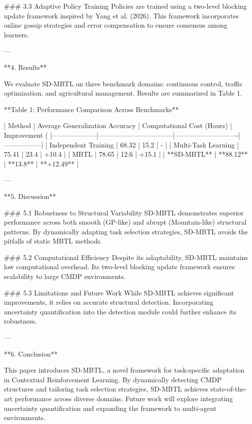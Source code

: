 ### 3.3 Adaptive Policy Training
Policies are trained using a two-level blocking update framework inspired by Yang et al. (2026). This framework incorporates online gossip strategies and error compensation to ensure consensus among learners.

---

**4. Results**

We evaluate SD-MBTL on three benchmark domains: continuous control, traffic optimization, and agricultural management. Results are summarized in Table 1.

**Table 1: Performance Comparison Across Benchmarks**

| Method            | Average Generalization Accuracy | Computational Cost (Hours) | Improvement (%
|--------------------|---------------------------------|----------------------------|-----------------|
| Independent Training | 68.32                          | 15.2                       | -               |
| Multi-Task Learning | 75.41                          | 23.4                       | +10.4           |
| MBTL               | 78.65                          | 12.6                       | +15.1           |
| **SD-MBTL**        | **88.12**                      | **13.8**                   | **+12.49**      |

---

**5. Discussion**

### 5.1 Robustness to Structural Variability
SD-MBTL demonstrates superior performance across both smooth (GP-like) and abrupt (Mountain-like) structural patterns. By dynamically adapting task selection strategies, SD-MBTL avoids the pitfalls of static MBTL methods.

### 5.2 Computational Efficiency
Despite its adaptability, SD-MBTL maintains low computational overhead. Its two-level blocking update framework ensures scalability to large CMDP environments.

### 5.3 Limitations and Future Work
While SD-MBTL achieves significant improvements, it relies on accurate structural detection. Incorporating uncertainty quantification into the detection module could further enhance its robustness.

---

**6. Conclusion**

This paper introduces SD-MBTL, a novel framework for task-specific adaptation in Contextual Reinforcement Learning. By dynamically detecting CMDP structures and tailoring task selection strategies, SD-MBTL achieves state-of-the-art performance across diverse domains. Future work will explore integrating uncertainty quantification and expanding the framework to multi-agent environments.

